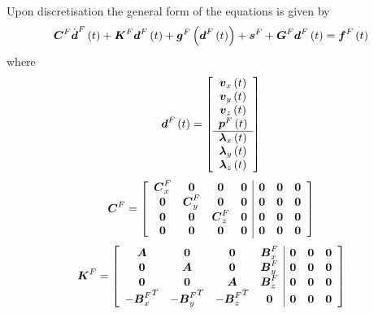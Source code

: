 Upon discretisation the general form of the equations is given by
\begin{equation}
  \matr{C}^{F}\fnof{{\dot{\vectr{d}}}^{F}}{t}+\matr{K}^{F}\fnof{\vectr{d}^{F}}{t}+\fnof{\vectr{g}^{F}}{\fnof{\vectr{d}^{F}}{t}}+\vectr{s}^{F}+\matr{G}^{F}\fnof{\vectr{d}^{F}}{t}=\fnof{\vectr{f}^{F}}{t}
\end{equation}
where
\begin{equation}
   \boldsymbol{d}^{F}\left( t \right) =\left[\begin{array}{c}
   \boldsymbol{v}_{x}\left( t \right)  \\
   \boldsymbol{v}_{y}\left( t \right)  \\
   \boldsymbol{v}_{z}\left( t \right)  \\
   \boldsymbol{p}^{F}\left( t \right)  \\ \hline
   \boldsymbol{\lambda}_{x}\left( t \right)  \\
   \boldsymbol{\lambda}_{y}\left( t \right)  \\
   \boldsymbol{\lambda}_{z}\left( t \right)  
  \end{array}\right]
\end{equation}
\begin{equation}
  \matr{C}^{F}=\left[\begin{array}{cccc|ccc}
    \matr{C}^{F}_{x} & \matr{0} & \matr{0} & \matr{0} & \matr{0} & \matr{0} & \matr{0} \\
    \matr{0} & \matr{C}^{F}_{y} & \matr{0} & \matr{0} & \matr{0} & \matr{0} & \matr{0} \\
    \matr{0} & \matr{0} & \matr{C}^{F}_{z} & \matr{0} & \matr{0} & \matr{0} & \matr{0} \\
    \matr{0} & \matr{0} & \matr{0} & \matr{0} & \matr{0} & \matr{0} & \matr{0}
  \end{array}\right]
\end{equation}
\begin{equation}
  \matr{K}^{F}=\left[\begin{array}{cccc|ccc}
    \matr{A} & \matr{0} & \matr{0} & \matr{B}^{F}_{x} & \matr{0} & \matr{0} & \matr{0} \\
    \matr{0} & \matr{A} & \matr{0} & \matr{B}^{F}_{y} & \matr{0} & \matr{0} & \matr{0} \\
    \matr{0} & \matr{0} & \matr{A} & \matr{B}^{F}_{z} & \matr{0} & \matr{0} & \matr{0} \\
    -\transpose{\matr{B}^{F}_{x}} & -\transpose{\matr{B}^{F}_{y}} & -\transpose{\matr{B}^{F}_{z}} & \matr{0} & \matr{0} & \matr{0} & \matr{0}
  \end{array}\right]
\end{equation}
